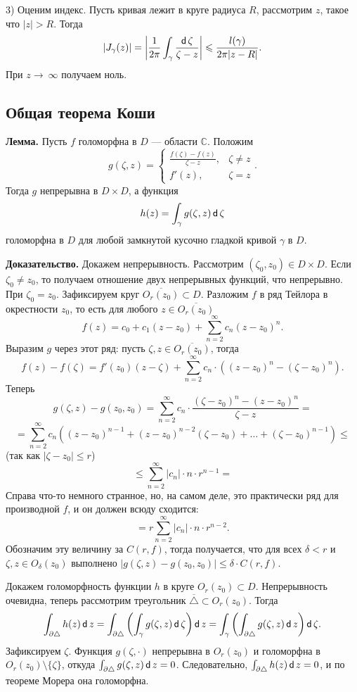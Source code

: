 3) Оценим индекс. Пусть кривая лежит в круге радиуса $R$, рассмотрим $z$, такое что $|z| > R$.
Тогда
\[
    |J_\gamma(z)| = \left| \frac{1}{2\pi} \int_\gamma \frac{\operatorname{\mathsf d} \zeta}{\zeta - z} \right| \leqslant \frac{l(\gamma)}{2\pi |z - R|}.
\]
При $z \to\ \infty$ получаем ноль.

\QED

\subsection{Общая теорема Коши}
\textbf{Лемма.} Пусть $f$ голоморфна в $D$ --- области $\mathbb C$.
Положим
\[
    g(\zeta, z) =
    \begin{cases}
        \frac{f(\zeta) - f(z)}{\zeta - z}, & \zeta \ne z \\
        f'(z), & \zeta = z
    \end{cases}.
\]
Тогда $g$ непрерывна в $D \times D$, а функция
\[
    h(z) = \int_\gamma g(\zeta, z) \operatorname{\mathsf d} \zeta
\]
голоморфна в $D$ для любой замкнутой кусочно гладкой кривой $\gamma$ в $D$.

\textbf{Доказательство.} Докажем непрерывность.
Рассмотрим $(\zeta_0, z_0) \in D \times D$.
Если $\zeta_0 \ne z_0$, то получаем отношение двух непрерывных функций, что непрерывно.
При $\zeta_0 = z_0$.
Зафиксируем круг $\overline{O_r(z_0)} \subset D$.
Разложим $f$ в ряд Тейлора в окрестности $z_0$, то есть для любого $z \in \overline{O_r(z_0)}$
\[
    f(z) = c_0 + c_1(z - z_0) + \sum_{n =2}^{\infty} c_n(z - z_0)^n.
\]
Выразим $g$ через этот ряд: пусть $\zeta, z \in \overline{O_r(z_0)}$, тогда
\[
    f(z) - f(\zeta) = f'(z_0)(z - \zeta) + \sum_{n=2}^{\infty} c_n \cdot \left( (z - z_0)^n - (\zeta - z_0)^n \right).
\]
Теперь
\[
    g(\zeta, z) - g(z_0, z_0) = \sum_{n=2}^{\infty} c_n \cdot \frac{(\zeta - z_0)^n - (z - z_0)^n}{\zeta - z} = 
\]
\[
    = \sum_{n=2}^{\infty} c_n \left((z - z_0)^{n-1} + (z - z_0)^{n-2}(\zeta - z_0) + \dots + (\zeta - z_0)^{n-1} \right) \le
\]
(так как $|\zeta - z_0| \le r$)
\[
    \le \sum_{n=2}^{\infty} |c_n| \cdot n \cdot r^{n-1} =
\]
Справа что-то немного странное, но, на самом деле, это практически ряд для производной $f$, и он должен всюду сходится:
\[
    = r \sum_{n=2}^{\infty} |c_n| \cdot n \cdot r^{n-2}.
\]
Обозначим эту величину за $C(r, f)$, тогда получается, что для всех $\delta < r$ и $\zeta, z \in O_\delta(z_0)$ выполнено $|g(\zeta, z) - g(z_0, z_0)| \le \delta \cdot C(r, f)$.

Докажем голоморфность функции $h$ в круге $O_r(z_0) \subset D$.
Непрерывность очевидна, теперь рассмотрим треугольник $\overline \triangle \subset O_r(z_0)$.
Тогда
\[
    \int_{\partial \triangle} h(z) \operatorname{\mathsf d} z = \int_{\partial \triangle} \left( \int_\gamma g(\zeta, z) \operatorname{\mathsf d} \zeta \right) \operatorname{\mathsf d} z = \int_\gamma \left( \int_{\partial \triangle} g(\zeta, z) \operatorname{\mathsf d} z \right) \operatorname{\mathsf d} \zeta.
\]
Зафиксируем $\zeta$. Функция $g(\zeta, \cdot)$ непрерывна в $O_r(z_0)$ и голоморфна в $O_r(z_0) \setminus \{\zeta\}$, откуда $\int_{\partial \triangle} g(\zeta, z) \operatorname{\mathsf d} z = 0$.
Следовательно, $\int_{\partial \triangle} h(z) \operatorname{\mathsf d} z = 0$, и по теореме Морера она голоморфна.


